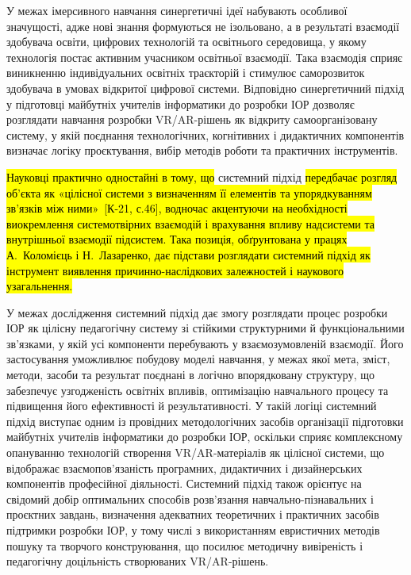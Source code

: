 У межах імерсивного навчання синергетичні ідеї набувають особливої значущості, адже нові знання формуються не ізольовано, а в результаті взаємодії здобувача освіти, цифрових технологій та освітнього середовища, у якому технологія постає активним учасником освітньої взаємодії. Така взаємодія сприяє виникненню індивідуальних освітніх траєкторій і стимулює саморозвиток здобувача в умовах відкритої цифрової системи. Відповідно синергетичний підхід у підготовці майбутніх учителів інформатики до розробки ІОР дозволяє розглядати навчання розробки VR/AR-рішень як відкриту самоорганізовану систему, у якій поєднання технологічних, когнітивних і дидактичних компонентів визначає логіку проєктування, вибір методів роботи та практичних інструментів.

\hl{Науковці практично одностайні в тому, що} системний підхід \hl{передбачає розгляд об'єкта як «цілісної системи з визначенням її елементів та упорядкуванням зв'язків між ними»~{[}К-21, с.46{]}, водночас акцентуючи на необхідності виокремлення системотвірних взаємодій і врахування впливу надсистеми та внутрішньої взаємодії підсистем. Така позиція, обґрунтована у працях А.~Коломієць і Н.~Лазаренко, дає підстави розглядати системний підхід як інструмент виявлення причинно-наслідкових залежностей і наукового узагальнення.}

У межах дослідження системний підхід дає змогу розглядати процес розробки ІОР як цілісну педагогічну систему зі стійкими структурними й функціональними зв'язками, у якій усі компоненти перебувають у взаємозумовленій взаємодії. Його застосування уможливлює побудову моделі навчання, у межах якої мета, зміст, методи, засоби та результат поєднані в логічно впорядковану структуру, що забезпечує узгодженість освітніх впливів, оптимізацію навчального процесу та підвищення його ефективності й результативності. У такій логіці системний підхід виступає одним із провідних методологічних засобів організації підготовки майбутніх учителів інформатики до розробки ІОР, оскільки сприяє комплексному опануванню технологій створення VR/AR-матеріалів як цілісної системи, що відображає взаємопов'язаність програмних, дидактичних і дизайнерських компонентів професійної діяльності. Системний підхід також орієнтує на свідомий добір оптимальних способів розв'язання навчально-пізнавальних і проєктних завдань, визначення адекватних теоретичних і практичних засобів підтримки розробки ІОР, у тому числі з використанням евристичних методів пошуку та творчого конструювання, що посилює методичну вивіреність і педагогічну доцільність створюваних VR/AR-рішень.

